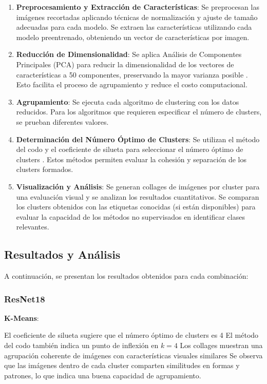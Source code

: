 \begin{enumerate} \item \textbf{Preprocesamiento y Extracción de Características}: Se preprocesan las imágenes recortadas aplicando técnicas de normalización y ajuste de tamaño adecuadas para cada modelo. Se extraen las características utilizando cada modelo preentrenado, obteniendo un vector de características por imagen. \item \textbf{Reducción de Dimensionalidad}: Se aplica Análisis de Componentes Principales (PCA) para reducir la dimensionalidad de los vectores de características a 50 componentes, preservando la mayor varianza posible \cite{jolliffe2016principal}. Esto facilita el proceso de agrupamiento y reduce el costo computacional. \item \textbf{Agrupamiento}: Se ejecuta cada algoritmo de clustering con los datos reducidos. Para los algoritmos que requieren especificar el número de clusters, se prueban diferentes valores. \item \textbf{Determinación del Número Óptimo de Clusters}: Se utilizan el método del codo y el coeficiente de silueta para seleccionar el número óptimo de clusters \cite{rousseeuw1987silhouettes}. Estos métodos permiten evaluar la cohesión y separación de los clusters formados. \item \textbf{Visualización y Análisis}: Se generan collages de imágenes por cluster para una evaluación visual y se analizan los resultados cuantitativos. Se comparan los clusters obtenidos con las etiquetas conocidas (si están disponibles) para evaluar la capacidad de los métodos no supervisados en identificar clases relevantes. \end{enumerate}

\subsection{Resultados y Análisis}

A continuación, se presentan los resultados obtenidos para cada combinación:

\subsubsection{ResNet18}

\textbf{K-Means}:

El coeficiente de silueta sugiere que el número óptimo de clusters es 4 %
El método del codo también indica un punto de inflexión en $k=4$ %
Los collages muestran una agrupación coherente de imágenes con características visuales similares %
Se observa que las imágenes dentro de cada cluster comparten similitudes en formas y patrones, lo que indica una buena capacidad de agrupamiento.


